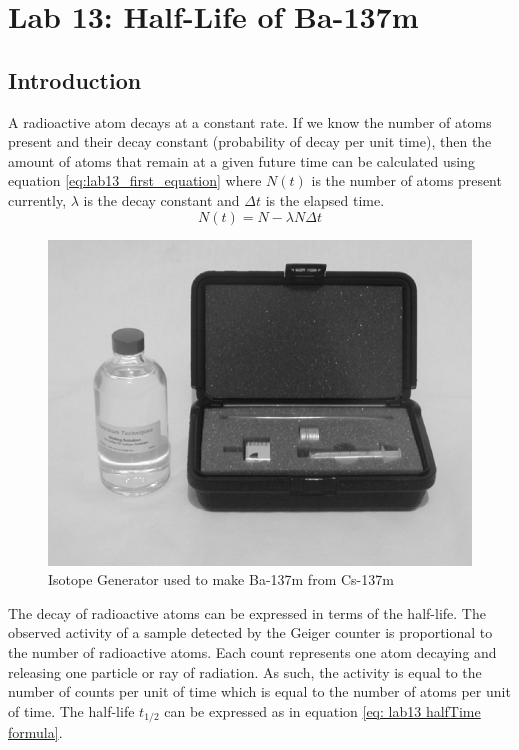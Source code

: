 \documentclass[reprint,amsmath,amssymb,aps,prl]{revtex4-2}
\begin{document}
\section{Lab 13: Half-Life of Ba-137m}
\subsection{Introduction}
A radioactive atom decays at a constant rate. If we know the number of atoms present and their decay constant (probability of decay per unit time), then the amount of atoms that remain at a given future time can be calculated using equation \ref{eq:lab13_first_equation} where $N(t)$ is the number of atoms present currently, $\lambda$ is the decay constant and $\Delta t$ is the elapsed time. 
\begin{equation} \label{eq: lab13_first_equation}
    N(t) = N - \lambda N \Delta t   
\end{equation}


\begin{figure}
    \centering
    \includegraphics[width = \columnwidth]{IsotopeGenerator.png}
    \caption{Isotope Generator used to make Ba-137m from Cs-137m}
    \label{fig: IsotopeGenerator}
\end{figure}


The decay of radioactive atoms can be expressed in terms of the half-life. The observed activity of a sample detected by the Geiger counter is proportional to the number of radioactive atoms. Each count represents one atom decaying and releasing one particle or ray of radiation. As such, the activity is equal to the number of counts per unit of time which is equal to the number of atoms per unit of time. The half-life $t_{1/2}$ can be expressed as in equation \ref{eq: lab13 halfTime formula}. 
\end{document}
